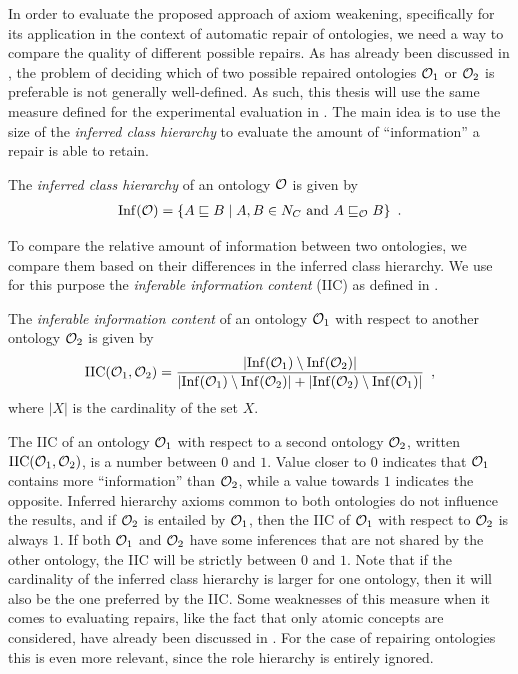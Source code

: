 
In order to evaluate the proposed approach of axiom weakening, specifically for its application in the context of automatic repair of ontologies, we need a way to compare the quality of different possible repairs. As has already been discussed in \cite{troquard2018repairing}, the problem of deciding which of two possible repaired ontologies $\mathcal{O}_1$ or $\mathcal{O}_2$ is preferable is not generally well-defined. As such, this thesis will use the same measure defined for the experimental evaluation in \cite{troquard2018repairing}. The main idea is to use the size of the \emph{inferred class hierarchy} to evaluate the amount of ``information'' a repair is able to retain.

\begin{definition}
  The \emph{inferred class hierarchy} of an ontology $\mathcal{O}$ is given by
  \begin{align*}
    {\ensuremath{\operatorname{Inf}}}(\mathcal{O}) = \{ A \sqsubseteq B \mid A, B \in N_C \text{ and } A \sqsubseteq_\mathcal{O} B \} \enspace.
  \end{align*}
\end{definition}

To compare the relative amount of information between two ontologies, we compare them based on their differences in the inferred class hierarchy. We use for this purpose the \emph{inferable information content} (IIC) as defined in \cite{troquard2018repairing}.

\begin{definition}
  The \emph{inferable information content} of an ontology $\mathcal{O}_1$ with respect to another ontology $\mathcal{O}_2$ is given by
  \begin{align*}
    {\ensuremath{\operatorname{IIC}}}(\mathcal{O}_1, \mathcal{O}_2) = \frac{| {\operatorname{Inf}}(\mathcal{O}_1) \setminus {\ensuremath{\operatorname{Inf}}}(\mathcal{O}_2) |}{|{\operatorname{Inf}}(\mathcal{O}_1) \setminus {\ensuremath{\operatorname{Inf}}}(\mathcal{O}_2)| + |{\operatorname{Inf}}(\mathcal{O}_2) \setminus {\ensuremath{\operatorname{Inf}}}(\mathcal{O}_1)|} \enspace,
  \end{align*}
  where $|X|$ is the cardinality of the set $X$.
\end{definition}

The IIC of an ontology $\mathcal{O}_1$ with respect to a second ontology $\mathcal{O}_2$, written ${\operatorname{IIC}}(\mathcal{O}_1, \mathcal{O}_2)$, is a number between $0$ and $1$. Value closer to $0$ indicates that $\mathcal{O}_1$ contains more ``information'' than $\mathcal{O}_2$, while a value towards $1$ indicates the opposite. Inferred hierarchy axioms common to both ontologies do not influence the results, and if $\mathcal{O}_2$ is entailed by $\mathcal{O}_1$, then the IIC of $\mathcal{O}_1$ with respect to $\mathcal{O}_2$ is always $1$. If both $\mathcal{O}_1$ and $\mathcal{O}_2$ have some inferences that are not shared by the other ontology, the IIC will be strictly between $0$ and $1$. Note that if the cardinality of the inferred class hierarchy is larger for one ontology, then it will also be the one preferred by the IIC. Some weaknesses of this measure when it comes to evaluating repairs, like the fact that only atomic concepts are considered, have already been discussed in \cite{troquard2018repairing}. For the case of repairing \SROIQ ontologies this is even more relevant, since the role hierarchy is entirely ignored.

